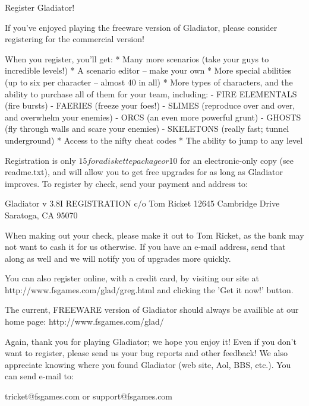          Register  Gladiator!

  If you've enjoyed playing the
freeware version of Gladiator, please
consider registering for the
commercial version!

When you register, you'll get:
  *  Many more scenarios (take your
     guys to incredible levels!)
  *  A scenario editor -- make your own
  *  More special abilities (up to
     six per character -- almost 40
     in all)
  *  More types of characters, and the
     ability to purchase all of them
     for your team, including:
     - FIRE ELEMENTALS (fire bursts)
     - FAERIES (freeze your foes!)
     - SLIMES (reproduce over and over,
       and overwhelm your enemies)
     - ORCS (an even more powerful
       grunt)
     - GHOSTS (fly through walls and
       scare your enemies)
     - SKELETONS (really fast; tunnel
       underground)
  *  Access to the nifty cheat codes
  *  The ability to jump to any level

  Registration is only $15 for a
diskette package or $10 for an
electronic-only copy (see readme.txt),
and will allow you to get free
upgrades for as long as Gladiator
improves. To register by check, send
your payment and address to:

    Gladiator v 3.8I REGISTRATION
    c/o Tom Ricket
    12645 Cambridge Drive
    Saratoga, CA  95070

  When making out your check, please
make it out to Tom Ricket, as the bank
may not want to cash it for us
otherwise.  If you have an e-mail
address, send that along as well and
we will notify you of upgrades more
quickly.

  You can also register online, with
a credit card, by visiting our site at
http://www.fsgames.com/glad/greg.html
and clicking the 'Get it now!'
button.

  The current, FREEWARE version of
Gladiator should always be availible
at our home page:
 http://www.fsgames.com/glad/

  Again, thank you for playing
Gladiator; we hope you enjoy it!
Even if you don't want to register,
please send us your bug reports and
other feedback!  We also appreciate
knowing where you found Gladiator
(web site, Aol, BBS, etc.).
You can send e-mail to:
    
    tricket@fsgames.com
          or
    support@fsgames.com

